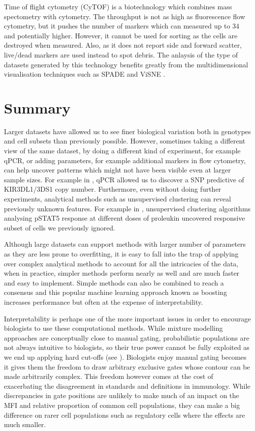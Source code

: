 Time of flight cytometry (CyTOF) is a biotechnology which combines mass spectometry with cytometry.
The throughput is not as high as fluorescence flow cytometry, but it pushes the number of markers which can measured up to 34 and potentially higher.
However, it cannot be used for sorting as the cells are destroyed when measured.
Also, as it does not report side and forward scatter, live/dead markers are used instead to spot debris.
The anlaysis of the type of datasets generated by this technology benefits greatly from the multidimensional visualisation techniques such as \gls{SPADE} \citep{Simonds:2011jh} and ViSNE \citep{Amir:2013jp}.


\section{Summary}

Larger datasets have allowed us to see finer biological variation both in genotypes and cell subsets than previously possible.
However, sometimes taking a different view of the same dataset, by doing a different kind of experiment, for example qPCR, or adding parameters, for example additional markers in flow cytometry, can help uncover patterns which might not have been visible even at larger sample sizes.
For example in , qPCR allowed us to discover a SNP predictive of KIR3DL1/3DS1 copy number.
Furthermore, even without doing further experiments, analytical methods such as unsupervised clustering can reveal previously unknown features.
For example in , unsupervised clustering algorithms analysing pSTAT5 response at different doses of proleukin uncovered responsive subset of cells we previously ignored.

Although large datasets can support methods with larger number of parameters as they are less prone to overfitting,
it is easy to fall into the trap of applying over complex analytical methods to account for all the intricacies of the data,
when in practice, simpler methods perform nearly as well and are much faster and easy to implement.
Simple methods can also be combined to reach a consensus and this popular machine learning approach known as boosting increases performance but often at the expense of interpretability.

Interpretability is perhaps one of the more important issues in order to encourage biologists to use these computational methods.
While mixture modelling approaches are conceptually close to manual gating, probabilistic populations are not always intuitive to biologists,
so their true power cannot be fully exploited as we end up applying hard cut-offs (see ).
Biologists enjoy manual gating becomes it gives them the freedom to draw arbitrary exclusive gates whose contour can be made arbitrarily complex.
This freedom however comes at the cost of exacerbating the disagreement in standards and definitions in immunology.
While discrepancies in gate positions are unlikely to make much of an impact on the MFI and relative proportion of common cell populations,
they can make a big difference on rarer cell populations such as regulatory cells where the effects are much smaller.

